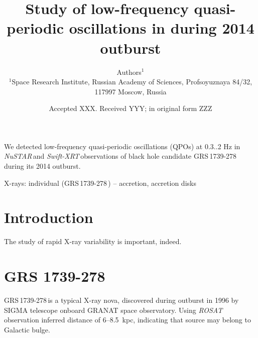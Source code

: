 \documentclass[a4paper,fleqn,usenatbib]{mnras}
\title[Study of low-frequency QPO in \grs]{Study of low-frequency quasi-periodic oscillations in \grs during 2014 outburst}
\author[Authors]{
Authors$^{1}$
\\
$^{1}$Space Research Institute, Russian Academy of Sciences, Profsoyuznaya 84/32, 117997 Moscow, Russia\\
}
\date{Accepted XXX. Received YYY; in original form ZZZ}
\def\grs{{GRS\,1739-278\,}}
\def\swiftx{{\em Swift-XRT\,}}
\def\nustar{{\em NuSTAR\,}}
\begin{document}
\label{firstpage}
\pagerange{\pageref{firstpage}--\pageref{lastpage}}
\maketitle

\begin{abstract}
\end{abstract}
We detected low-frequency quasi-periodic oscillations (QPOs) at 0.3..2 Hz in \nustar and \swiftx observations of black hole candidate \grs during its 2014 outburst.

\begin{keywords}
X-rays: individual (\grs)  -- accretion, accretion disks	
\end{keywords}


\section{Introduction}
\label{sec:intro} 
The study of rapid X-ray variability is important, indeed.

\section{GRS 1739-278}

\grs is a typical X-ray nova, discovered during outburst in 1996  \citep{paul96} by SIGMA \citep{paul91} telescope onboard GRANAT space observatory.
Using {\it ROSAT} observation \cite{greiner96} inferred distance of 6--8.5~kpc, indicating that source may belong to Galactic bulge. 	

\end{document}
